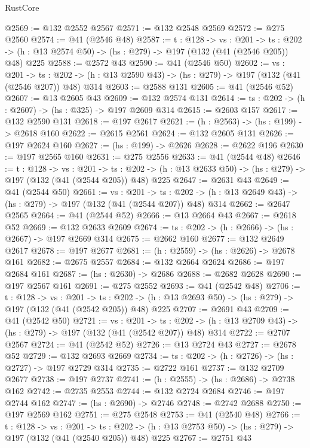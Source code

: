 \begin{lexlean}{RustCore}
\begin{coremodule}
@2569 := @132 @2552 @2567
@2571 := @132 @2548 @2569
@2572 := @275 @2560
@2574 := @41 (@2546 @48)
@2587 := {t : @128} ->
  {vs : @201} ->
  {ts : @202} -> (h : @13 @2574 @50) -> (hs : @279) -> @197 (@132 (@41 (@2546 @205)) @48) @225
@2588 := @2572 @43
@2590 := @41 (@2546 @50)
@2602 := {vs : @201} ->
  {ts : @202} -> (h : @13 @2590 @43) -> (hs : @279) -> @197 (@132 (@41 (@2546 @207)) @48) @314
@2603 := @2588 @131
@2605 := @41 (@2546 @52)
@2607 := @13 @2605 @43
@2609 := @132 @2574 @131
@2614 := {ts : @202} -> (h : @2607) -> (hs : @325) -> @197 @2609 @314
@2615 := @2603 @157
@2617 := @132 @2590 @131
@2618 := @197 @2617
@2621 := (h : @2563) -> (hs : @199) -> @2618 @160
@2622 := @2615 @2561
@2624 := @132 @2605 @131
@2626 := @197 @2624 @160
@2627 := (hs : @199) -> @2626
@2628 := @2622 @196
@2630 := @197 @2565 @160
@2631 := @275 @2556
@2633 := @41 (@2544 @48)
@2646 := {t : @128} ->
  {vs : @201} ->
  {ts : @202} -> (h : @13 @2633 @50) -> (hs : @279) -> @197 (@132 (@41 (@2544 @205)) @48) @225
@2647 := @2631 @43
@2649 := @41 (@2544 @50)
@2661 := {vs : @201} ->
  {ts : @202} -> (h : @13 @2649 @43) -> (hs : @279) -> @197 (@132 (@41 (@2544 @207)) @48) @314
@2662 := @2647 @2565
@2664 := @41 (@2544 @52)
@2666 := @13 @2664 @43
@2667 := @2618 @52
@2669 := @132 @2633 @2609
@2674 := {ts : @202} -> (h : @2666) -> (hs : @2667) -> @197 @2669 @314
@2675 := @2662 @160
@2677 := @132 @2649 @2617
@2678 := @197 @2677
@2681 := (h : @2559) -> (hs : @2626) -> @2678 @161
@2682 := @2675 @2557
@2684 := @132 @2664 @2624
@2686 := @197 @2684 @161
@2687 := (hs : @2630) -> @2686
@2688 := @2682 @2628
@2690 := @197 @2567 @161
@2691 := @275 @2552
@2693 := @41 (@2542 @48)
@2706 := {t : @128} ->
  {vs : @201} ->
  {ts : @202} -> (h : @13 @2693 @50) -> (hs : @279) -> @197 (@132 (@41 (@2542 @205)) @48) @225
@2707 := @2691 @43
@2709 := @41 (@2542 @50)
@2721 := {vs : @201} ->
  {ts : @202} -> (h : @13 @2709 @43) -> (hs : @279) -> @197 (@132 (@41 (@2542 @207)) @48) @314
@2722 := @2707 @2567
@2724 := @41 (@2542 @52)
@2726 := @13 @2724 @43
@2727 := @2678 @52
@2729 := @132 @2693 @2669
@2734 := {ts : @202} -> (h : @2726) -> (hs : @2727) -> @197 @2729 @314
@2735 := @2722 @161
@2737 := @132 @2709 @2677
@2738 := @197 @2737
@2741 := (h : @2555) -> (hs : @2686) -> @2738 @162
@2742 := @2735 @2553
@2744 := @132 @2724 @2684
@2746 := @197 @2744 @162
@2747 := (hs : @2690) -> @2746
@2748 := @2742 @2688
@2750 := @197 @2569 @162
@2751 := @275 @2548
@2753 := @41 (@2540 @48)
@2766 := {t : @128} ->
  {vs : @201} ->
  {ts : @202} -> (h : @13 @2753 @50) -> (hs : @279) -> @197 (@132 (@41 (@2540 @205)) @48) @225
@2767 := @2751 @43

\end{coremodule}
\end{lexlean}
